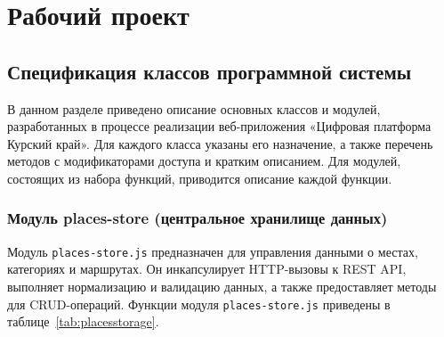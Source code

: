\section{Рабочий проект}

\subsection{Спецификация классов программной системы}

В данном разделе приведено описание основных классов и модулей, разработанных в процессе реализации веб-приложения «Цифровая платформа Курский край». Для каждого класса указаны его назначение, а также перечень методов с модификаторами доступа и кратким описанием. Для модулей, состоящих из набора функций, приводится описание каждой функции.

\subsubsection{Модуль places-store (центральное хранилище данных)}

Модуль \texttt{places-store.js} предназначен для управления данными о местах, категориях и маршрутах. Он инкапсулирует HTTP-вызовы к REST API, выполняет нормализацию и валидацию данных, а также предоставляет методы для CRUD-операций. Функции модуля \texttt{places-store.js} приведены в таблице~\ref{tab:placesstorage}.

